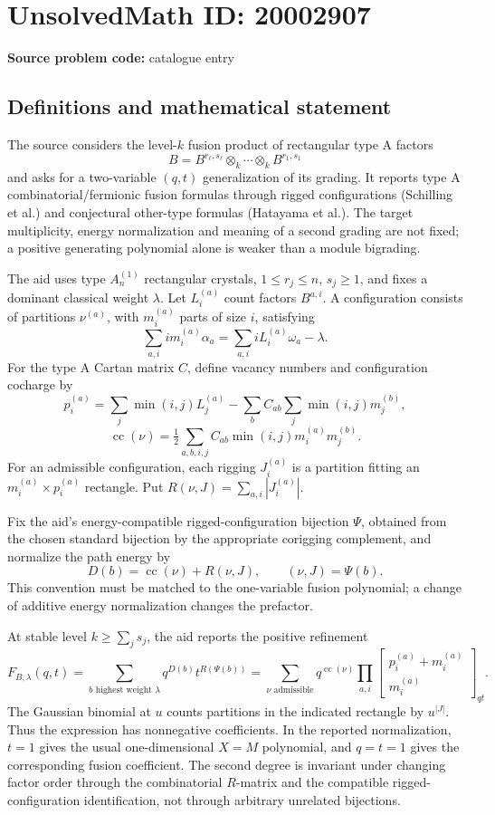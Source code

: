 \documentclass[11pt]{article}
\begin{document}
\section*{UnsolvedMath ID: 20002907}
\textbf{Source problem code:} catalogue entry
\subsection{Definitions and mathematical statement}
The source considers the level-\(k\) fusion product of rectangular type A factors
\[
 B=B^{r_\ell,s_\ell}\otimes_k\cdots\otimes_k B^{r_1,s_1}
\]
and asks for a two-variable \((q,t)\) generalization of its grading. It reports type A combinatorial/fermionic fusion formulas through rigged configurations (Schilling et al.) and conjectural other-type formulas (Hatayama et al.). The target multiplicity, energy normalization and meaning of a second grading are not fixed; a positive generating polynomial alone is weaker than a module bigrading.

The aid uses type \(A_n^{(1)}\) rectangular crystals, \(1\le r_j\le n\), \(s_j\ge1\), and fixes a dominant classical weight \(\lambda\). Let \(L_i^{(a)}\) count factors \(B^{a,i}\). A configuration consists of partitions \(\nu^{(a)}\), with \(m_i^{(a)}\) parts of size \(i\), satisfying
\[
 \sum_{a,i}i m_i^{(a)}\alpha_a
       =\sum_{a,i}iL_i^{(a)}\omega_a-\lambda.
\]
For the type A Cartan matrix \(C\), define vacancy numbers and configuration cocharge by
\[
 p_i^{(a)}=\sum_j\min(i,j)L_j^{(a)}
      -\sum_b C_{ab}\sum_j\min(i,j)m_j^{(b)},
\]
\[
 \operatorname{cc}(\nu)=\tfrac12\sum_{a,b,i,j}
          C_{ab}\min(i,j)m_i^{(a)}m_j^{(b)}.
\]
For an admissible configuration, each rigging \(J_i^{(a)}\) is a partition fitting an \(m_i^{(a)}\times p_i^{(a)}\) rectangle. Put \(R(\nu,J)=\sum_{a,i}|J_i^{(a)}|\).

Fix the aid's energy-compatible rigged-configuration bijection \(\Psi\), obtained from the chosen standard bijection by the appropriate corigging complement, and normalize the path energy by
\[
 D(b)=\operatorname{cc}(\nu)+R(\nu,J),\qquad (\nu,J)=\Psi(b).
\]
This convention must be matched to the one-variable fusion polynomial; a change of additive energy normalization changes the prefactor.

At stable level \(k\ge\sum_j s_j\), the aid reports the positive refinement
\[
 F_{B,\lambda}(q,t)=\sum_{b\text{ highest weight }\lambda}
                     q^{D(b)}t^{R(\Psi(b))}
 =\sum_{\nu\text{ admissible}}q^{\operatorname{cc}(\nu)}
       \prod_{a,i}
       \begin{bmatrix}p_i^{(a)}+m_i^{(a)}\\m_i^{(a)}\end{bmatrix}_{qt}.
\]
The Gaussian binomial at \(u\) counts partitions in the indicated rectangle by \(u^{|J|}\). Thus the expression has nonnegative coefficients. In the reported normalization, \(t=1\) gives the usual one-dimensional \(X=M\) polynomial, and \(q=t=1\) gives the corresponding fusion coefficient. The second degree is invariant under changing factor order through the combinatorial \(R\)-matrix and the compatible rigged-configuration identification, not through arbitrary unrelated bijections.
\end{document}
